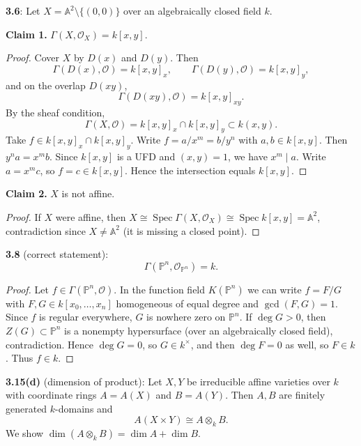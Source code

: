 \documentclass[12pt]{article}
\numberwithin{thm}{subsection}
\numberwithin{defn}{subsection}
\numberwithin{lemma}{subsection}
\numberwithin{example}{subsection}
\numberwithin{notation}{subsection}
\numberwithin{cor}{subsection}
\numberwithin{remark}{subsection}
\numberwithin{condition}{subsection}
\numberwithin{question}{subsection}
\numberwithin{construction}{subsection}
\numberwithin{construction}{subsection}
\numberwithin{construction}{subsection}
\begin{document}
\textbf{3.6}:
Let $X=\mathbb A^2\setminus\{(0,0)\}$ over an algebraically closed field $k$.

\medskip
\textbf{Claim 1.} $\Gamma(X,\mathcal O_X)=k[x,y]$.

\begin{proof}
Cover $X$ by $D(x)$ and $D(y)$. Then
\[
\Gamma(D(x),\mathcal O)=k[x,y]_x,\qquad \Gamma(D(y),\mathcal O)=k[x,y]_y,
\]
and on the overlap $D(xy)$,
\[
\Gamma(D(xy),\mathcal O)=k[x,y]_{xy}.
\]
By the sheaf condition,
\[
\Gamma(X,\mathcal O)=k[x,y]_x\cap k[x,y]_y \subset k(x,y).
\]
Take $f\in k[x,y]_x\cap k[x,y]_y$. Write $f=a/x^m=b/y^n$ with $a,b\in k[x,y]$.
Then $y^n a=x^m b$. Since $k[x,y]$ is a UFD and $(x,y)=1$, we have $x^m\mid a$.
Write $a=x^m c$, so $f=c\in k[x,y]$. Hence the intersection equals $k[x,y]$.
\end{proof}

\medskip
\textbf{Claim 2.} $X$ is not affine.

\begin{proof}
If $X$ were affine, then $X\cong \operatorname{Spec}\Gamma(X,\mathcal O_X)\cong \operatorname{Spec}k[x,y]=\mathbb A^2$,
contradiction since $X\neq \mathbb A^2$ (it is missing a closed point).
\end{proof}

\bigskip

\textbf{3.8} (correct statement):
\[
\Gamma(\mathbb P^n,\mathcal O_{\mathbb P^n})=k.
\]

\begin{proof}
Let $f\in \Gamma(\mathbb P^n,\mathcal O)$.
In the function field $K(\mathbb P^n)$ we can write $f=F/G$ with $F,G\in k[x_0,\dots,x_n]$ homogeneous of equal degree and
$\gcd(F,G)=1$.
Since $f$ is regular everywhere, $G$ is nowhere zero on $\mathbb P^n$.
If $\deg G>0$, then $Z(G)\subset \mathbb P^n$ is a nonempty hypersurface (over an algebraically closed field), contradiction.
Hence $\deg G=0$, so $G\in k^\times$, and then $\deg F=0$ as well, so $F\in k$.
Thus $f\in k$.
\end{proof}

\bigskip

\textbf{3.15(d)} (dimension of product):
Let $X,Y$ be irreducible affine varieties over $k$ with coordinate rings $A=A(X)$ and $B=A(Y)$.
Then $A,B$ are finitely generated $k$-domains and
\[
A(X\times Y)\cong A\otimes_k B.
\]
We show $\dim(A\otimes_k B)=\dim A+\dim B$.
\end{document}
